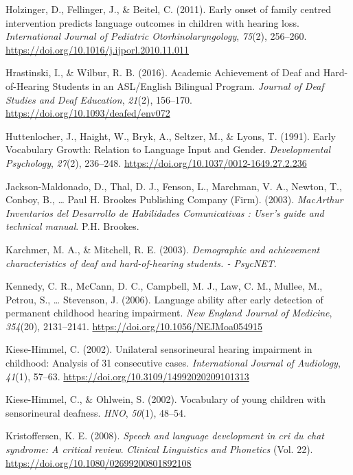 \documentclass[english,man]{apa6}
\begin{document}
\leavevmode\hypertarget{ref-holzinger2011}{}%
Holzinger, D., Fellinger, J., \& Beitel, C. (2011). Early onset of family centred intervention predicts language outcomes in children with hearing loss. \emph{International Journal of Pediatric Otorhinolaryngology}, \emph{75}(2), 256--260. \url{https://doi.org/10.1016/j.ijporl.2010.11.011}

\leavevmode\hypertarget{ref-hrastinski2016}{}%
Hrastinski, I., \& Wilbur, R. B. (2016). Academic Achievement of Deaf and Hard-of-Hearing Students in an ASL/English Bilingual Program. \emph{Journal of Deaf Studies and Deaf Education}, \emph{21}(2), 156--170. \url{https://doi.org/10.1093/deafed/env072}

\leavevmode\hypertarget{ref-huttenlocher1991}{}%
Huttenlocher, J., Haight, W., Bryk, A., Seltzer, M., \& Lyons, T. (1991). Early Vocabulary Growth: Relation to Language Input and Gender. \emph{Developmental Psychology}, \emph{27}(2), 236--248. \url{https://doi.org/10.1037/0012-1649.27.2.236}

\leavevmode\hypertarget{ref-jackson-maldonado2003}{}%
Jackson-Maldonado, D., Thal, D. J., Fenson, L., Marchman, V. A., Newton, T., Conboy, B., \ldots{} Paul H. Brookes Publishing Company (Firm). (2003). \emph{MacArthur Inventarios del Desarrollo de Habilidades Comunicativas : User's guide and technical manual}. P.H. Brookes.

\leavevmode\hypertarget{ref-karchmer2003}{}%
Karchmer, M. A., \& Mitchell, R. E. (2003). \emph{Demographic and achievement characteristics of deaf and hard-of-hearing students. - PsycNET}.

\leavevmode\hypertarget{ref-kennedy2006}{}%
Kennedy, C. R., McCann, D. C., Campbell, M. J., Law, C. M., Mullee, M., Petrou, S., \ldots{} Stevenson, J. (2006). Language ability after early detection of permanent childhood hearing impairment. \emph{New England Journal of Medicine}, \emph{354}(20), 2131--2141. \url{https://doi.org/10.1056/NEJMoa054915}

\leavevmode\hypertarget{ref-kiese-himmel2002}{}%
Kiese-Himmel, C. (2002). Unilateral sensorineural hearing impairment in childhood: Analysis of 31 consecutive cases. \emph{International Journal of Audiology}, \emph{41}(1), 57--63. \url{https://doi.org/10.3109/14992020209101313}

\leavevmode\hypertarget{ref-kiese-himmel2002a}{}%
Kiese-Himmel, C., \& Ohlwein, S. (2002). Vocabulary of young children with sensorineural deafness. \emph{HNO}, \emph{50}(1), 48--54.

\leavevmode\hypertarget{ref-kristoffersen2008}{}%
Kristoffersen, K. E. (2008). \emph{Speech and language development in cri du chat syndrome: A critical review}. \emph{Clinical Linguistics and Phonetics} (Vol. 22). \url{https://doi.org/10.1080/02699200801892108}
\end{document}
